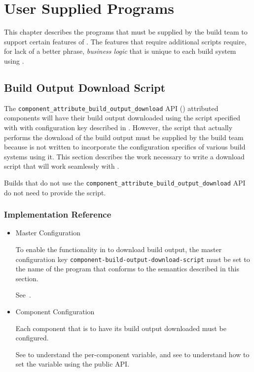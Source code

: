 \chapter{User Supplied Programs}

This chapter describes the programs that must be supplied by the build
team to support certain features of \lmsbw.  The \lmsbw features that
require additional scripts require, for lack of a better phrase,
\emph{business logic} that is unique to each build system using
\lmsbw.


\section{Build Output Download Script}\label{api:build-output-download-script}

The \texttt{component\_attribute\_build\_output\_download} API
() attributed components will have
their build output downloaded using the script specified with with
configuration key described in
.  However, the
script that actually performs the download of the build output must be
supplied by the build team because \lmsbw is not written to
incorporate the configuration specifics of various build systems using
it.  This section describes the work necessary to write a download
script that will work seamlessly with \lmsbw.

Builds that do not use the
\texttt{component\_attribute\_build\_output\_download} API do not need
to provide the script.

\subsection{Implementation Reference}

\begin{itemize}
  \item{Master Configuration}

    To enable the functionality in \lmsbw to download build output,
    the master configuration key
    \texttt{component-build-output-download-script} must be set to the
    name of the program that conforms to the semantics described in
    this section.

    See~.

  \item{Component Configuration}

    Each component that is to have its build output downloaded must
    be configured.

    See  to understand the
    per-component variable, and see 
    to understand how to set the variable using the public API.
\end{itemize}

